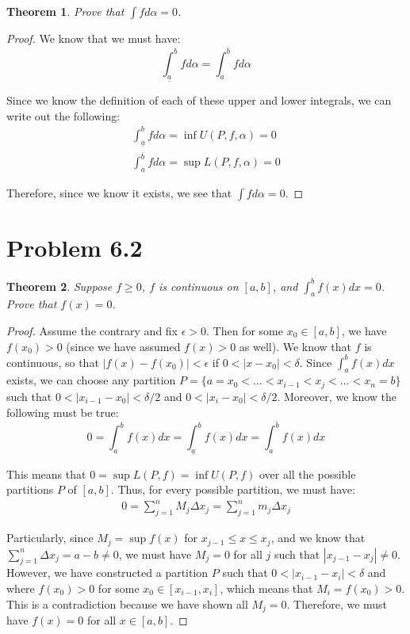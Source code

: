 \documentclass[psamsfonts]{amsart}
\newtheorem{thm}{Theorem}[section]
\theoremstyle{definition}
\theoremstyle{remark}
\numberwithin{equation}{section}
\begin{document}
\begin{thm}
Prove that $\int f d \alpha = 0$. 
\end{thm}

\begin{proof}
We know that we must have:
\begin{equation}
\int_{\underline{a}}^b f d \alpha = \int_{a}^{\overline{b}} f d \alpha
\end{equation}

Since we know the definition of each of these upper and lower integrals, we can write out the following:
\begin{eqnarray}
\int_{\underline{a}}^b f d \alpha = \inf U(P,f,\alpha) = 0 \\
\int_{a}^{\overline{b}} f d \alpha = \sup L(P,f,\alpha) = 0
\end{eqnarray}

Therefore, since we know it exists, we see that $\int f d\alpha = 0$. 
\end{proof}

\section{Problem 6.2}

\begin{thm}
Suppose $f \geq 0$, $f$ is continuous on $[a,b]$, and $\int_{a}^b f(x) dx = 0$. Prove that $f(x) = 0$. 
\end{thm}

\begin{proof}
Assume the contrary and fix $\epsilon > 0$. Then for some $x_0 \in [a,b]$, we have $f(x_0) > 0$ (since we have assumed $f(x) > 0$ as well). We know that $f$ is continuous, so that $|f(x) - f(x_0)| <  \epsilon$ if $0 < |x - x_0| < \delta$. Since $\int_a^b f(x) dx$ exists, we can choose any partition $P = \{ a = x_0 < \ldots < x_{i-1} < x_j < \ldots < x_n = b \}$ such that $0 < |x_{i-1} - x_0 | < \delta/2$ and $0 < |x_i - x_0 |  < \delta/2$. Moreover, we know the following must be true:
\begin{equation}
0 = \int_a^b f(x) dx = \int_{\underline{a}}^b f(x) dx = \int_a^{\overline{b}} f(x) dx
\end{equation}

This means that $0 = \sup L(P,f) = \inf U(P,f)$ over all the possible partitions $P$ of $[a,b]$. Thus, for every possible partition, we must have:
\begin{eqnarray}
0 = \sum_{j=1}^n M_j \Delta x_j = \sum_{j=1}^n m_j \Delta x_j
\end{eqnarray}

Particularly, since $M_j = \sup f(x)$ for $x_{j-1} \leq x \leq x_j$, and we know that $\sum_{j=1}^n \Delta x_j = a - b \neq 0$, we must have $M_j = 0$ for all $j$ such that $|x_{j-1} - x_j| \neq 0$. However, we have constructed a partition $P$ such that $0 < |x_{i-1} - x_i | < \delta$ and where $f(x_0) > 0$ for some $x_0 \in [x_{i-1},x_i]$, which means that $M_i = f(x_0) > 0$. This is a contradiction because we have shown all $M_j = 0$. Therefore, we must have $f(x) = 0$ for all $x \in [a,b]$. 
\end{proof}
\end{document}
